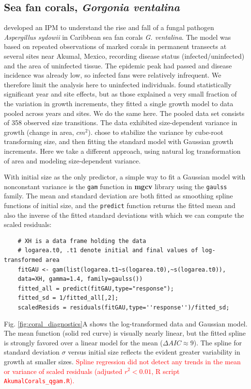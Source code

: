 \documentclass[12pt]{article}
\newcommand{\new}{\textcolor{red}}
\begin{document}
\subsection{Sea fan corals, \emph{Gorgonia ventalina}}
\label{sec:seafans}
\cite{bruno-etal-2011} developed an IPM to understand the rise and fall of a fungal pathogen \emph{Aspergillus sydowii} in Caribbean sea fan corals \emph{G. ventalina}. 
The model was based on repeated observations of marked corals in permanent transects at several sites near Akumal, Mexico, recording disease status (infected/uninfected) and the area of uninfected tissue. 
The epidemic peak had passed and disease incidence was already low, so infected fans were relatively infrequent. 
We therefore limit the analysis here to uninfected individuals.
\citet{bruno-etal-2011} found statistically significant year and site effects, but as those explained a very small fraction of the variation in growth increments, they fitted a single growth model to data pooled across years and sites. 
We do the same here. 
The pooled data set consists of 358 observed size transitions. 
The data exhibited size-dependent variance in growth (change in area, $cm^2$).  
\cite{bruno-etal-2011} chose to stabilize the variance by cube-root transforming size, and then fitting the standard model with Gaussian growth increments. 
Here we take a different approach, using natural log transformation of area and modeling size-dependent variance. 

With initial size as the only predictor, a simple way to fit a Gaussian model with nonconstant variance is the \texttt{gam} function in \textbf{mgcv} library \citep{wood-2017} using the \texttt{gaulss} family. 
The mean and standard deviation are both fitted as smoothing spline functions of initial size, and the \texttt{predict} function returns the fitted mean and also the inverse of the fitted standard deviations with which we can compute the scaled residuals: 
\begin{lstlisting}
	# XH is a data frame holding the data
	# logarea.t0, .t1 denote initial and final values of log-transformed area   
	fitGAU <- gam(list(logarea.t1~s(logarea.t0),~s(logarea.t0)),
	data=XH, gamma=1.4, family=gaulss())
	fitted_all = predict(fitGAU,type="response"); 
	fitted_sd = 1/fitted_all[,2]; 
	scaledResids = residuals(fitGAU,type=''response'')/fitted_sd;  
\end{lstlisting}
Fig. \ref{fig:coral_diagnostics}A shows the log-transformed data and Gaussian model. 
The mean function (solid red curve) is visually nearly linear, but the fitted spline is strongly favored over a linear model for the mean ($\Delta AIC \approx 9$). 
The spline for standard deviation $\sigma$ versus initial size reflects the evident greater variability in growth at smaller sizes.  
\new{Spline regression did not detect any trends in the mean or variance of scaled residuals (adjusted $r^2 < 0.01$, R script \texttt{AkumalCorals\_qgam.R}).}  
\end{document}
